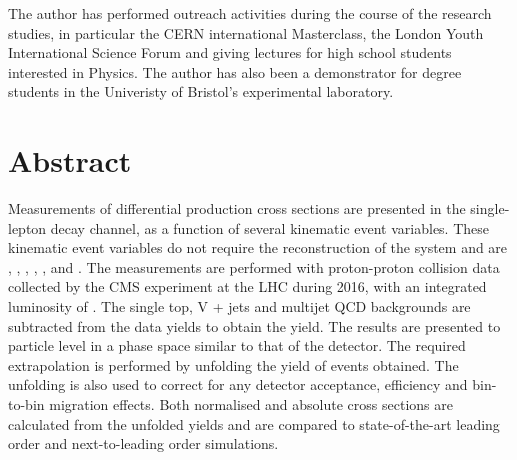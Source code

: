 The author has performed outreach activities during the course of the research studies, in particular the CERN international Masterclass, the London Youth International Science Forum and giving lectures for high school students interested in Physics. 
The author has also been a demonstrator for degree students 
in the Univeristy of Bristol's experimental laboratory.
\clearpage

\chapter*{Abstract}

Measurements of differential \ttbar{} production cross sections are presented in the single-lepton decay channel, as a function of several kinematic event variables.
These kinematic event variables do not require the reconstruction of the \ttbar{} system and are \NJET{}, \HT{}, \ST{}, \ptmiss{}, \WPT{}, \LPT{} and \LETA{}.
The measurements are performed with proton-proton collision data collected by the CMS experiment at the LHC during 2016, with an integrated luminosity of \Lumi{}.
The single top, V + jets and multijet QCD backgrounds are subtracted from the data yields to obtain the \ttbar{} yield.
The results are presented to particle level in a phase space similar to that of the detector.
The required extrapolation is performed by unfolding the yield of \ttbar{} events obtained.
The unfolding is also used to correct for any detector acceptance, efficiency and bin-to-bin migration effects.
Both normalised and absolute cross sections are calculated from the unfolded \ttbar{} yields and are compared to state-of-the-art leading order and next-to-leading order \ttbar{} simulations.
\clearpage

\newpage\null\thispagestyle{empty}
\tableofcontents

\newpage\null\thispagestyle{empty}
\listoffigures
\listoftables
\clearpage




